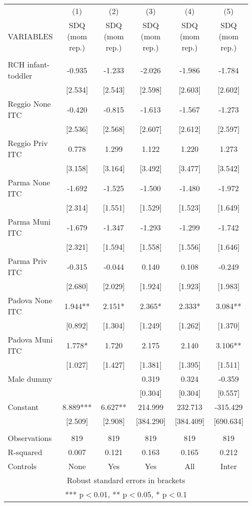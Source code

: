 \begin{tabular}{lccccc} \hline
 & (1) & (2) & (3) & (4) & (5) \\
VARIABLES & SDQ (mom rep.) & SDQ (mom rep.) & SDQ (mom rep.) & SDQ (mom rep.) & SDQ (mom rep.) \\ \hline
 &  &  &  &  &  \\
RCH infant-toddler & -0.935 & -1.233 & -2.026 & -1.986 & -1.784 \\
 & [2.534] & [2.543] & [2.598] & [2.603] & [2.602] \\
Reggio None ITC & -0.420 & -0.815 & -1.613 & -1.567 & -1.273 \\
 & [2.536] & [2.568] & [2.607] & [2.612] & [2.597] \\
Reggio Priv ITC & 0.778 & 1.299 & 1.122 & 1.220 & 1.273 \\
 & [3.158] & [3.164] & [3.492] & [3.477] & [3.542] \\
Parma None ITC & -1.692 & -1.525 & -1.500 & -1.480 & -1.972 \\
 & [2.314] & [1.551] & [1.529] & [1.523] & [1.649] \\
Parma Muni ITC & -1.679 & -1.347 & -1.293 & -1.299 & -1.742 \\
 & [2.321] & [1.594] & [1.558] & [1.556] & [1.646] \\
Parma Priv ITC & -0.315 & -0.044 & 0.140 & 0.108 & -0.249 \\
 & [2.680] & [2.029] & [1.924] & [1.923] & [1.983] \\
Padova None ITC & 1.944** & 2.151* & 2.365* & 2.333* & 3.084** \\
 & [0.892] & [1.304] & [1.249] & [1.262] & [1.370] \\
Padova Muni ITC & 1.778* & 1.720 & 2.175 & 2.140 & 3.106** \\
 & [1.027] & [1.427] & [1.381] & [1.395] & [1.511] \\
Male dummy &  &  & 0.319 & 0.324 & -0.359 \\
 &  &  & [0.304] & [0.304] & [0.557] \\
Constant & 8.889*** & 6.627** & 214.999 & 232.713 & -315.429 \\
 & [2.509] & [2.908] & [384.290] & [384.409] & [690.634] \\
 &  &  &  &  &  \\
Observations & 819 & 819 & 819 & 819 & 819 \\
R-squared & 0.007 & 0.121 & 0.163 & 0.165 & 0.212 \\
 Controls & None & Yes & Yes & All & Inter \\ \hline
\multicolumn{6}{c}{ Robust standard errors in brackets} \\
\multicolumn{6}{c}{ *** p$<$0.01, ** p$<$0.05, * p$<$0.1} \\
\end{tabular}
